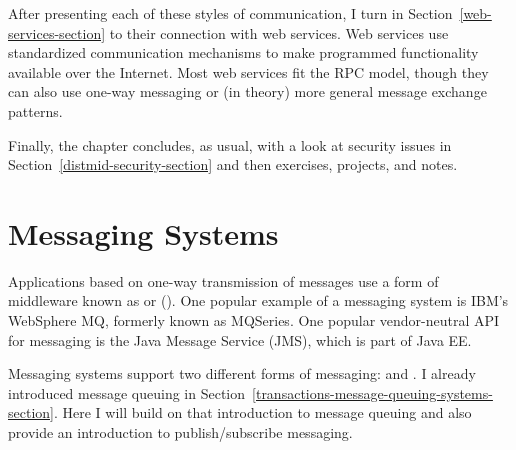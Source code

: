 After presenting each of these styles of communication, I turn in
Section~\ref{web-services-section} to their connection with web
services.  Web services use standardized communication mechanisms to
make programmed functionality available over the Internet.  Most web
services fit the RPC model, though they can also use one-way messaging
or (in theory) more general message exchange patterns.

Finally, the chapter concludes, as usual, with a look at security
issues in Section~\ref{distmid-security-section} and then exercises,
projects, and notes.

\section{Messaging Systems}\label{messaging-section}

Applications based on one-way transmission of messages use a form of
middleware known as  or
 ().  One popular
example of a messaging system is IBM's WebSphere MQ, formerly known as
MQSeries.  One popular vendor-neutral API for messaging is the Java
Message Service (JMS), which is part of Java EE.

Messaging systems support two different forms of messaging:
 and .  I
already introduced message queuing in
Section~\ref{transactions-message-queuing-systems-section}.  Here I
will build on that introduction to message queuing and also
provide an introduction to publish/subscribe messaging.

